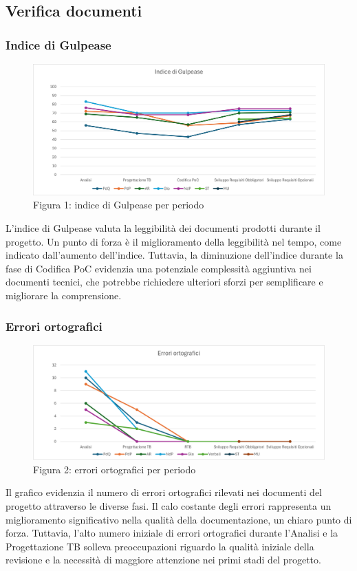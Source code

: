 \documentclass{article}
\begin{document}
\subsection{Verifica documenti}
\subsubsection{Indice di Gulpease}

    \begin{figure}[H]
    \centering
    \includegraphics{documenti/grafici/IndiceDiGulpeasePB.png}
     \caption{Figura 1: indice di Gulpease per periodo}
    \end{figure}

    L'indice di Gulpease valuta la leggibilità dei documenti prodotti durante il progetto. Un punto di forza è il miglioramento della leggibilità nel tempo, come indicato dall'aumento dell'indice. Tuttavia, la diminuzione dell'indice durante la fase di Codifica PoC evidenzia una potenziale complessità aggiuntiva nei documenti tecnici, che potrebbe richiedere ulteriori sforzi per semplificare e migliorare la comprensione.



\subsubsection{Errori ortografici}
   \begin{figure}[H]
    \centering
    \includegraphics{documenti/grafici/ErroriOrtograficiPB.png}
     \caption{Figura 2: errori ortografici per periodo}
    \end{figure}
     Il grafico evidenzia il numero di errori ortografici rilevati nei documenti del progetto attraverso le diverse fasi. Il calo costante degli errori rappresenta un miglioramento significativo nella qualità della documentazione, un chiaro punto di forza. Tuttavia, l'alto numero iniziale di errori ortografici durante l'Analisi e la Progettazione TB solleva preoccupazioni riguardo la qualità iniziale della revisione e la necessità di maggiore attenzione nei primi stadi del progetto.
\end{document}
